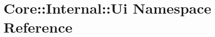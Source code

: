 \hypertarget{namespace_core_1_1_internal_1_1_ui}{\section{\-Core\-:\-:\-Internal\-:\-:\-Ui \-Namespace \-Reference}
\label{namespace_core_1_1_internal_1_1_ui}
}
